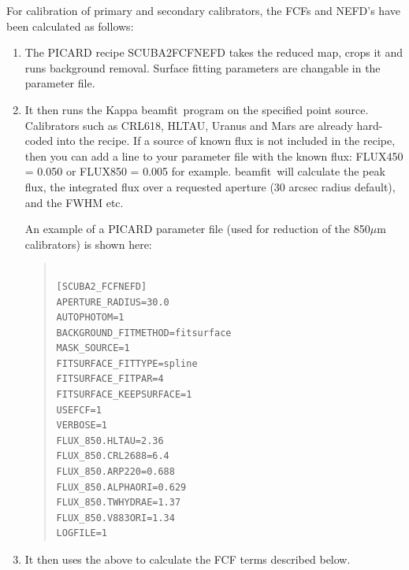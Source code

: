 \documentclass[twoside,11pt]{article}
\newcommand{\xref}[3]{#1}
\renewcommand{\_}{\texttt{\symbol{95}}}
\newenvironment{myquote}{\begin{quote}\begin{small}}{\end{small}\end{quote}}
\newcommand{\task}[1]{\textsf{#1}}
\newcommand{\beamfit}{\xref{\task{beamfit}}{sun95}{BEAMFIT}}
\begin{document}
For calibration of primary and secondary calibrators, the FCFs and
NEFD's have been calculated as follows:
\begin{enumerate}
\item{The PICARD recipe SCUBA2\_FCFNEFD takes the reduced map, crops
    it and runs background removal. Surface fitting parameters are
    changable in the parameter file.}
\item{It then runs the Kappa \beamfit\ program on the specified
    point source. Calibrators such as CRL618, HLTAU, Uranus and Mars
    are already hard-coded into the recipe. If a source of known flux
    is not included in the recipe, then you can add a line to your
    parameter file with the known flux: FLUX\_450 = 0.050 or FLUX\_850
    = 0.005 for example. \beamfit\ will calculate the peak flux, the
    integrated flux over a requested aperture (30 arcsec radius
    default), and the FWHM etc.}

  An example of a PICARD parameter file (used for reduction of the
  850$\mu$m calibrators) is shown here:

\begin{myquote}
\begin{verbatim}

[SCUBA2_FCFNEFD]
APERTURE_RADIUS=30.0
AUTOPHOTOM=1
BACKGROUND_FITMETHOD=fitsurface
MASK_SOURCE=1
FITSURFACE_FITTYPE=spline
FITSURFACE_FITPAR=4
FITSURFACE_KEEPSURFACE=1
USEFCF=1
VERBOSE=1
FLUX_850.HLTAU=2.36
FLUX_850.CRL2688=6.4
FLUX_850.ARP220=0.688
FLUX_850.ALPHAORI=0.629
FLUX_850.TWHYDRAE=1.37
FLUX_850.V883ORI=1.34
LOGFILE=1
\end{verbatim}
\end{myquote}

\item {It then uses the above to calculate the FCF terms described below.}
\end{enumerate}
\end{document}
